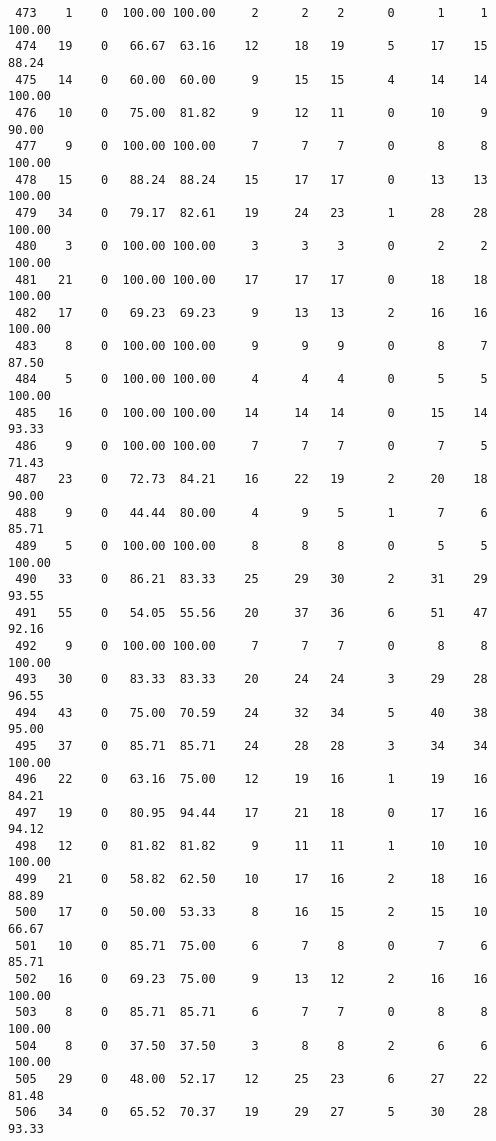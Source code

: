 \begin{verbatim}
 473    1    0  100.00 100.00     2      2    2      0      1     1   100.00
 474   19    0   66.67  63.16    12     18   19      5     17    15    88.24
 475   14    0   60.00  60.00     9     15   15      4     14    14   100.00
 476   10    0   75.00  81.82     9     12   11      0     10     9    90.00
 477    9    0  100.00 100.00     7      7    7      0      8     8   100.00
 478   15    0   88.24  88.24    15     17   17      0     13    13   100.00
 479   34    0   79.17  82.61    19     24   23      1     28    28   100.00
 480    3    0  100.00 100.00     3      3    3      0      2     2   100.00
 481   21    0  100.00 100.00    17     17   17      0     18    18   100.00
 482   17    0   69.23  69.23     9     13   13      2     16    16   100.00
 483    8    0  100.00 100.00     9      9    9      0      8     7    87.50
 484    5    0  100.00 100.00     4      4    4      0      5     5   100.00
 485   16    0  100.00 100.00    14     14   14      0     15    14    93.33
 486    9    0  100.00 100.00     7      7    7      0      7     5    71.43
 487   23    0   72.73  84.21    16     22   19      2     20    18    90.00
 488    9    0   44.44  80.00     4      9    5      1      7     6    85.71
 489    5    0  100.00 100.00     8      8    8      0      5     5   100.00
 490   33    0   86.21  83.33    25     29   30      2     31    29    93.55
 491   55    0   54.05  55.56    20     37   36      6     51    47    92.16
 492    9    0  100.00 100.00     7      7    7      0      8     8   100.00
 493   30    0   83.33  83.33    20     24   24      3     29    28    96.55
 494   43    0   75.00  70.59    24     32   34      5     40    38    95.00
 495   37    0   85.71  85.71    24     28   28      3     34    34   100.00
 496   22    0   63.16  75.00    12     19   16      1     19    16    84.21
 497   19    0   80.95  94.44    17     21   18      0     17    16    94.12
 498   12    0   81.82  81.82     9     11   11      1     10    10   100.00
 499   21    0   58.82  62.50    10     17   16      2     18    16    88.89
 500   17    0   50.00  53.33     8     16   15      2     15    10    66.67
 501   10    0   85.71  75.00     6      7    8      0      7     6    85.71
 502   16    0   69.23  75.00     9     13   12      2     16    16   100.00
 503    8    0   85.71  85.71     6      7    7      0      8     8   100.00
 504    8    0   37.50  37.50     3      8    8      2      6     6   100.00
 505   29    0   48.00  52.17    12     25   23      6     27    22    81.48
 506   34    0   65.52  70.37    19     29   27      5     30    28    93.33

\end{verbatim}

